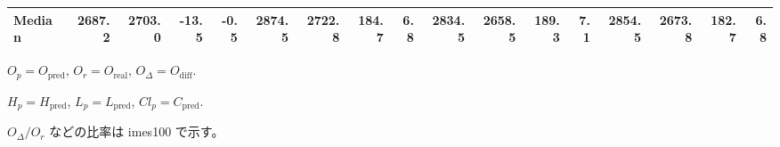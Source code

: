 \begin{threeparttable}
{\begin{tabular}{lrrrrrrrrrrrrrrrr}
 Median & 2687.2 & 2703.0 &      -13.5 &           -0.5 & 2874.5 & 2722.8 &      184.7 &            6.8 & 2834.5 & 2658.5 &      189.3 &            7.1 & 2854.5 & 2673.8 &       182.7 &              6.8 \\
\bottomrule
\end{tabular}
}
\begin{tablenotes}\footnotesize
\item $O_p=O_{\text{pred}}$, $O_r=O_{\text{real}}$, $O_\Delta=O_{\text{diff}}$.
\item $H_p=H_{\text{pred}}$, $L_p=L_{\text{pred}}$, $Cl_p=C_{\text{pred}}$.
\item $O_\Delta/O_r$ などの比率は 	imes100 で示す。
\end{tablenotes}
\end{threeparttable}
\endgroup
